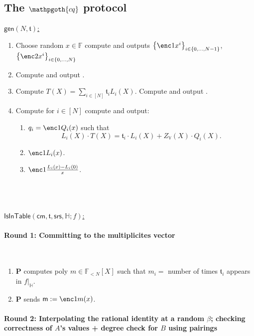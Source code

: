 \documentclass[11pt]{article} %
\newcommand{\cq}{\ensuremath{\mathpgoth{cq} }\xspace}
\newcommand{\F}{\ensuremath{\mathbb F}\xspace}
\newcommand{\srs}{\ensuremath{\mathsf{srs}}\xspace}
\newcommand{\cm}{\ensuremath{\mathsf{cm}}\xspace}
\newcommand{\defeq}{:=}
\newcommand{\sett}[2]{\ensuremath{\set{#1}_{#2}}\xspace}
\newcommand{\gen}{\ensuremath{\mathsf{gen}}\xspace}
\newcommand{\prv}{\ensuremath{\mathsf{\mathbf{P}}}\xspace}
\newcommand{\set}[1]{\ensuremath{\left\{#1\right\}}\xspace}
\newcommand{\polysofdeg}[1]{\ensuremath{\F_{< #1}[X]}\xspace}
\newcommand{\sumi}[1]{\sum_{i\in[#1]}}
\newcommand{\restricttoset}[2]{\ensuremath{#1|_{#2}}\xspace}
\newcommand{\isintable}{\ensuremath{\mathsf{IsInTable}}\xspace}
\newcommand{\subspace}{\ensuremath{\mathbb{H}}\xspace}
\newcommand{\bigspace}{\ensuremath{\mathbb{V}}\xspace}
\newcommand{\tabsize}{\ensuremath{N}\xspace}
\newcommand{\tab}{\ensuremath{\mathfrak{t}}\xspace}
\newcommand{\m}{\ensuremath{\mathsf{m}}\xspace}
\begin{document}
\subsection{The \cq protocol}

\underline{$\gen(\tabsize,\tab)$:}\\ \noindent
\begin{enumerate}
\item Choose random $x\in \F$ compute and outputs \sett{\enc1{x^i}}{i\in \set{0,\ldots,\tabsize-1}},\sett{\enc2{x^i}}{i\in \set{0,\ldots,\tabsize}}
\item Compute and output \enc2{Z_\bigspace(x)}.
\item Compute $T(X)=\sumi{\tabsize}\tab_i L_i(X)$. Compute and output .
 \item Compute for $i\in [\tabsize]$ compute and output:
 \begin{enumerate}
  \item $q_i=\enc1{Q_i(x)}$ such that
  \[L_i(X)\cdot T(X)=\tab_i\cdot L_i(X) + Z_\bigspace(X)\cdot Q_i(X).\]
  \item $\enc1{L_i(x)}$.
  \item $\enc1{\frac{L_i(x)-L_i(0)}{x}}$.
 \end{enumerate}

\end{enumerate}

\noindent
\\
\\
\\
\noindent
\underline{$\isintable(\cm,\tab,\srs,\subspace;f)$:} \\ \noindent
\paragraph{\textbf{Round 1:} Committing to the multiplicites vector} \ \\
\begin{enumerate}
 \item \prv computes poly $m\in \polysofdeg{\tabsize}$ such that $m_i=$ number of times $\tab_i$ appears in \restricttoset{f}{\subspace}.
 \item \prv sends $\m\defeq \enc1{m(x)}$.
 \end{enumerate}
	\paragraph{\textbf{Round 2:} Interpolating the rational identity at a random $\beta$; checking correctness of  $A$'s values + degree check for $B$ using pairings} \ \\
 
\end{document}
